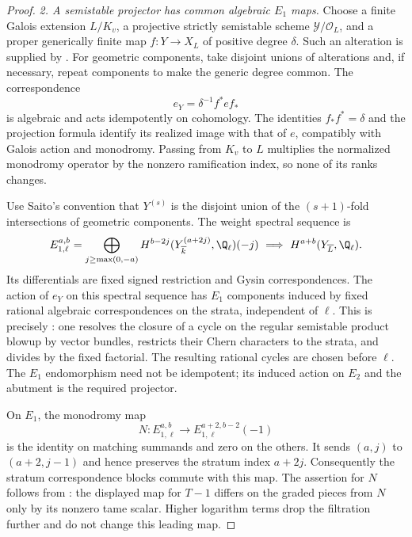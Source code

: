 \begin{proof}
\emph{2. A semistable projector has common algebraic $E_1$ maps.}
Choose a finite Galois extension $L/K_v$, a projective strictly
semistable scheme $\mathcal Y/\mathcal O_L$, and a proper
generically finite map $f:Y\to X_L$ of positive degree $\delta$.
Such an alteration is supplied by
\citet[Corollary~1.2.6, author p.~16]{c_saito2003weights}.
For geometric components, take disjoint unions of alterations and,
if necessary, repeat components to make the generic degree common.
The correspondence
\[
                 e_Y=\delta^{-1}f^* e f_*
\]
is algebraic and acts idempotently on cohomology. The identities $f_*f^*=\delta$ and
the projection formula identify its realized image with that of
$e$, compatibly with Galois action and monodromy.
Passing from $K_v$ to $L$ multiplies the normalized monodromy
operator by the nonzero ramification index, so none of its ranks
changes.

Use Saito's convention that $Y^{(s)}$ is the disjoint union of the
$(s+1)$-fold intersections of geometric components. The weight
spectral sequence is
\[
 E_{1,\ell}^{a,b}
 =\bigoplus_{j\geq\max(0,-a)}
 H^{b-2j}(Y^{(a+2j)}_{\overline k},\Q_\ell)(-j)
 \ \Longrightarrow\ H^{a+b}(Y_{\overline L},\Q_\ell).
\]
Its differentials are fixed signed restriction and Gysin
correspondences. The action of $e_Y$ on this spectral sequence
has $E_1$ components induced by fixed rational algebraic
correspondences on the strata, independent of $\ell$.
This is precisely
\citet[Lemma~2.4.2, Corollary~2.4.3 and Proposition~2.4.4,
complete proofs, author pp.~34--36]{c_saito2003weights}:
one resolves the closure of a cycle on the regular semistable
product blowup by vector bundles, restricts their Chern characters
to the strata, and divides by the fixed factorial.
The resulting rational cycles are chosen before $\ell$.
The $E_1$ endomorphism need not be idempotent; its induced action
on $E_2$ and the abutment is the required projector.

On $E_1$, the monodromy map
\[
 N:E_{1,\ell}^{a,b}\longrightarrow
       E_{1,\ell}^{a+2,b-2}(-1)
\]
is the identity on matching summands and zero on the others.
It sends $(a,j)$ to $(a+2,j-1)$ and hence preserves the stratum
index $a+2j$. Consequently the stratum correspondence blocks
commute with this map. The assertion for $N$ follows from
\citet[Corollary~2.2.4(2), author pp.~21--22]{c_saito2003weights}:
the displayed map for $T-1$ differs on the graded pieces from
$N$ only by its nonzero tame scalar. Higher logarithm terms drop
the filtration further and do not change this leading map.


\end{proof}
